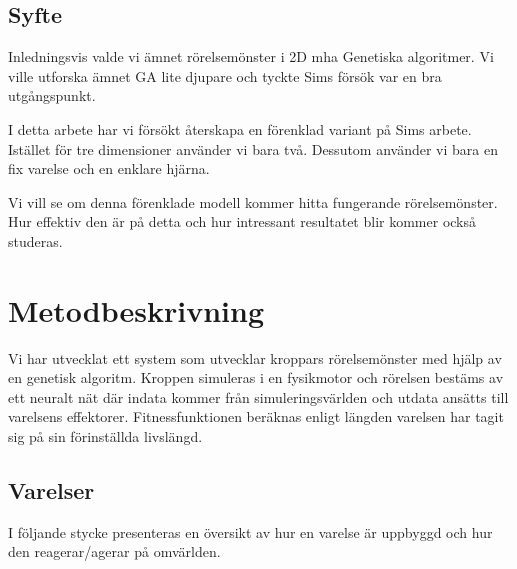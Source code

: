 \documentclass[titlepage, twocolumn, a4paper, 12pt, swedish]{article}
\begin{document}
\subsection{Syfte}
Inledningsvis valde vi ämnet rörelsemönster i 2D mha Genetiska algoritmer. Vi ville utforska ämnet GA lite djupare och tyckte Sims försök var en bra utgångspunkt. 

I detta arbete har vi försökt återskapa en förenklad variant på Sims arbete. Istället för tre dimensioner använder vi bara två. Dessutom använder vi bara en fix varelse och en enklare hjärna. 

Vi vill se om denna förenklade modell kommer hitta fungerande rörelsemönster. Hur effektiv den är på detta och hur intressant resultatet blir kommer också studeras. 




\section{Metodbeskrivning}
Vi har utvecklat ett system som utvecklar kroppars rörelsemönster med hjälp av en genetisk algoritm. Kroppen simuleras i en fysikmotor och rörelsen bestäms av ett neuralt nät där indata kommer från simuleringsvärlden och utdata ansätts till varelsens effektorer. Fitnessfunktionen beräknas enligt längden varelsen har tagit sig på sin förinställda livslängd.


\subsection{Varelser}
I följande stycke presenteras en översikt av hur en varelse är uppbyggd och hur den reagerar/agerar på omvärlden.
\end{document}
